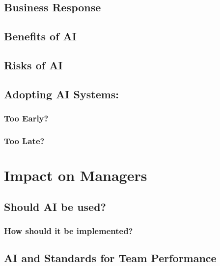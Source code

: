 \documentclass[
]{book}
\begin{document}
\hypertarget{business-response}{%
\section{Business Response}\label{business-response}}

\hypertarget{benefits-of-ai}{%
\section{Benefits of AI}\label{benefits-of-ai}}

\hypertarget{risks-of-ai}{%
\section{Risks of AI}\label{risks-of-ai}}

\hypertarget{adopting-ai-systems}{%
\section{Adopting AI Systems:}\label{adopting-ai-systems}}

\hypertarget{too-early}{%
\subsection{Too Early?}\label{too-early}}

\hypertarget{too-late}{%
\subsection{Too Late?}\label{too-late}}

\hypertarget{impact-on-managers}{%
\chapter{Impact on Managers}\label{impact-on-managers}}

\hypertarget{should-ai-be-used}{%
\section{Should AI be used?}\label{should-ai-be-used}}

\hypertarget{how-should-it-be-implemented}{%
\subsection{How should it be implemented?}\label{how-should-it-be-implemented}}

\hypertarget{ai-and-standards-for-team-performance}{%
\section{AI and Standards for Team Performance}\label{ai-and-standards-for-team-performance}}
\end{document}
